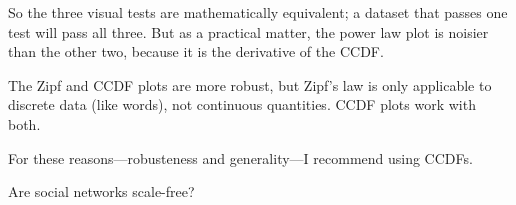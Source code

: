 \documentclass[10pt]{book}
\begin{document}
So the three visual tests are mathematically equivalent; a dataset
that passes one test will pass all three.  But as a practical
matter, the power law plot is noisier than the other two, because
it is the derivative of the CCDF.

The Zipf and CCDF plots are more robust, but Zipf's law is only
applicable to discrete data (like words), not continuous quantities.
CCDF plots work with both.

For these reasons---robusteness and generality---I recommend
using CCDFs.


\begin{ex}

Are social networks scale-free?


\end{ex}
\end{document}
